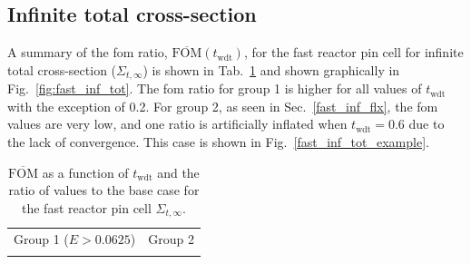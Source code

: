 \subsection{Infinite total cross-section}
\label{sec:fast_inf_tot_cross_section}
A summary of the \gls{fom} ratio,
$\overline{\mathrm{FOM}}(t_{\mathrm{wdt}})$, for the fast reactor pin
cell for infinite total cross-section ($\Sigma_{t,
  \infty}$) is shown in Tab.~\ref{tab:fast_inf_tot} and shown
graphically in Fig.~\ref{fig:fast_inf_tot}. The \gls{fom} ratio for
group 1 is higher for all values of $t_{\mathrm{wdt}}$ with the
exception of 0.2. For group 2, as seen in Sec.~\ref{fast_inf_flx}, the
\gls{fom} values are very low, and one ratio is artificially inflated
when $t_{\mathrm{wdt}} = 0.6$
due to the lack of convergence. This case is shown in Fig.~\ref{fast_inf_tot_example}.
\begin{table}[hbtp]
  \centering
  \caption[$\overline{\mathrm{FOM}}$ and ratio for
    the fast reactor pin cell $\Sigma_{t,\infty}$.]{$\overline{\mathrm{FOM}}$ as a function of
    $t_{\mathrm{wdt}}$ and the ratio of values to the base case for
    the fast reactor pin cell $\Sigma_{t,\infty}$.}
  \begin{tabular}{cc} Group 1 ($E > 0.0625$) & Group 2 \\
    
 &
   
  \end{tabular}
\label{tab:fast_inf_tot}
\end{table}
